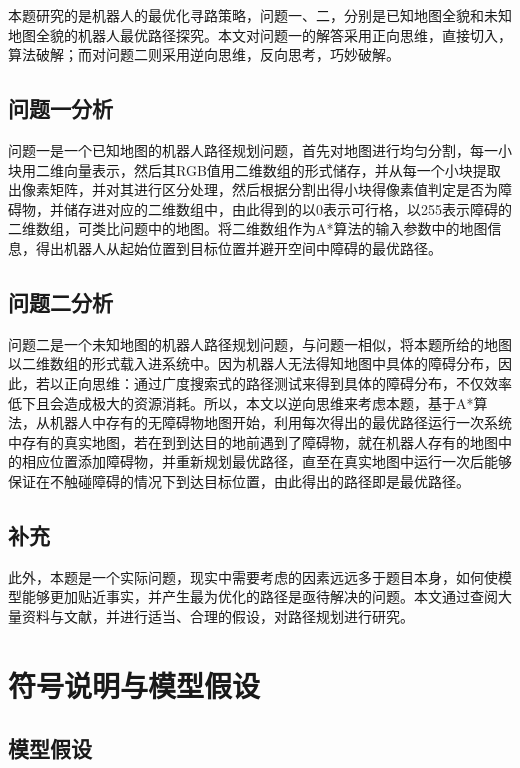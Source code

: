 \documentclass[withoutpreface,bwprint]{cumcmthesis} %
\begin{document}
本题研究的是机器人的最优化寻路策略，问题一、二，分别是已知地图全貌和未知地图全貌的机器人最优路径探究。本文对问题一的解答采用正向思维，直接切入，算法破解；而对问题二则采用逆向思维，反向思考，巧妙破解。

\subsection{问题一分析}

问题一是一个已知地图的机器人路径规划问题，首先对地图进行均匀分割，每一小块用二维向量表示，然后其RGB值用二维数组的形式储存，并从每一个小块提取出像素矩阵，并对其进行区分处理，然后根据分割出得小块得像素值判定是否为障碍物，并储存进对应的二维数组中，由此得到的以0表示可行格，以255表示障碍的二维数组，可类比问题中的地图。将二维数组作为A*算法的输入参数中的地图信息，得出机器人从起始位置到目标位置并避开空间中障碍的最优路径。

\subsection{问题二分析}

问题二是一个未知地图的机器人路径规划问题，与问题一相似，将本题所给的地图以二维数组的形式载入进系统中。因为机器人无法得知地图中具体的障碍分布，因此，若以正向思维：通过广度搜索式的路径测试来得到具体的障碍分布，不仅效率低下且会造成极大的资源消耗。所以，本文以逆向思维来考虑本题，基于A*算法，从机器人中存有的无障碍物地图开始，利用每次得出的最优路径运行一次系统中存有的真实地图，若在到到达目的地前遇到了障碍物，就在机器人存有的地图中的相应位置添加障碍物，并重新规划最优路径，直至在真实地图中运行一次后能够保证在不触碰障碍的情况下到达目标位置，由此得出的路径即是最优路径。

\subsection{补充}

此外，本题是一个实际问题，现实中需要考虑的因素远远多于题目本身，如何使模型能够更加贴近事实，并产生最为优化的路径是亟待解决的问题。本文通过查阅大量资料与文献，并进行适当、合理的假设，对路径规划进行研究。

\section{符号说明与模型假设}

\subsection{模型假设}
\end{document}

